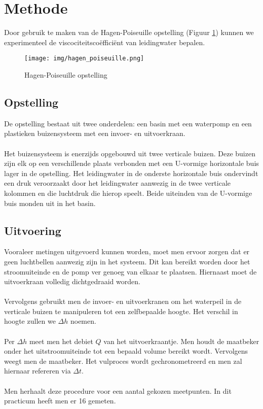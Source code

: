 \section{Methode}

Door gebruik te maken van de Hagen-Poiseuille opstelling (Figuur \ref{fig:hagen-pois}) 
kunnen we experimenteel de viscociteitsco\"effici\"ent van leidingwater bepalen. \\

\begin{figure}[h]
    \centering
    \caption{Hagen-Poiseuille opstelling}
    \texttt{[image: img/hagen\_poiseuille.png]}
    \label{fig:hagen-pois}
\end{figure}

\subsection{Opstelling}

De opstelling bestaat uit twee onderdelen: een basin
met een waterpomp en een plastieken buizensysteem met
een invoer- en uitvoerkraan.
\\ \\
Het buizensysteem is enerzijds opgebouwd uit twee verticale 
buizen. Deze buizen zijn elk op een verschillende plaats 
verbonden met een U-vormige horizontale buis lager in de opstelling.
Het leidingwater in de onderste horizontale buis ondervindt een 
druk veroorzaakt door het leidingwater aanwezig in de twee verticale
kolommen en die luchtdruk die hierop speelt. Beide uiteinden van de 
U-vormige buis monden uit in het basin.

\subsection{Uitvoering}

Vooraleer metingen uitgevoerd kunnen worden, moet men ervoor zorgen 
dat er geen luchtbellen aanwezig zijn in het systeem. 
Dit kan bereikt worden door het stroomuiteinde en de pomp
ver genoeg van elkaar te plaatsen. Hiernaast moet de uitvoerkraan 
volledig dichtgedraaid worden.
\\ \\
Vervolgens gebruikt men de invoer- en uitvoerkranen om
het waterpeil in de verticale buizen te manipuleren tot
een zelfbepaalde hoogte. Het verschil in hoogte zullen we
$\Delta h$ noemen.
\\ \\
Per $\Delta h$ meet men het debiet $Q$ van het
uitvoerkraantje. Men houdt de maatbeker onder het uitstroomuiteinde 
tot een bepaald volume bereikt wordt.
Vervolgens weegt men de maatbeker. Het vulproces wordt gechronometreerd
en men zal hiernaar refereren via $\Delta t$.
\\ \\
Men herhaalt deze procedure voor een aantal gekozen meetpunten.
In dit practicum heeft men er 16 gemeten.

